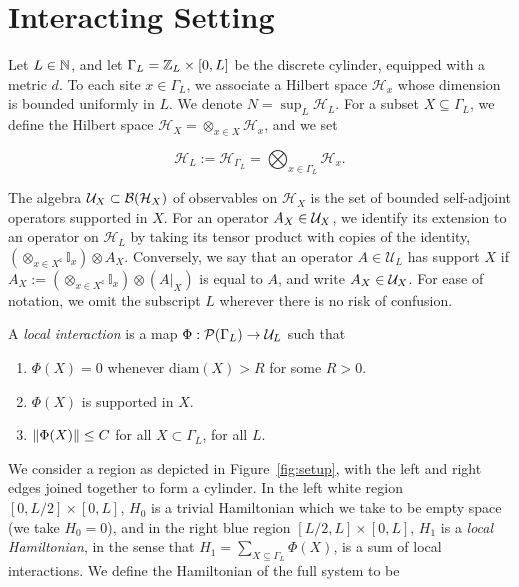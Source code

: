 \documentclass[12pt, letterpaper]{article}
\begin{document}
\section{Interacting Setting}

Let $L\in\mathbb{N}$, and let $\Gamma_L = \mathbb{Z}_L \times [0,L]$ be the discrete cylinder, equipped with a metric $d$. To each site $x \in \Gamma_L$, we associate a Hilbert space $\mathcal{H}_x$ whose dimension is bounded uniformly in $L$. We denote $N = \sup_L{\mathcal{H}_L}$. For a subset $X \subseteq \Gamma_L$, we define the Hilbert space $\mathcal{H}_X = \otimes_{x \in X} \mathcal{H}_x$, and we set 

\[\mathcal{H}_L := \mathcal{H}_{\Gamma_L} = \bigotimes_{x \in \Gamma_L}\mathcal{H}_x.\] 


The algebra $\mathcal{U}_X \subset \mathcal{B}(\mathcal{H}_X)$ of observables on $\mathcal{H}_X$ is the set of bounded self-adjoint operators supported in $X$. For an operator $A_X \in \mathcal{U}_X$, we identify its extension to an operator on $\mathcal{H}_L$ by taking its tensor product with copies of the identity, $(\otimes_{x \in X^\mathsf{c}} \mathbb{I}_x) \otimes A_X$. Conversely, we say that an operator $A \in \mathcal{U}_L$ has support $X$ if $A_X := (\otimes_{x \in X^\mathsf{c}} \mathbb{I}_x)\otimes (A|_{X})$ is equal to $A$, and write $A_X \in \mathcal{U}_X$. For ease of notation, we omit the subscript $L$ wherever there is no risk of confusion.

A \textit{local interaction} is a map $\Phi : \mathcal{P}(\Gamma_L) \to \mathcal{U}_L$ such that 

\begin{enumerate}

\item $\Phi(X) = 0$ whenever $\text{diam}(X) > R$ for some $R>0$.

\item $\Phi(X)$ is supported in $X$.

\item $\lVert \Phi(X) \rVert \leq C$ for all $X \subset \Gamma_L$, for all $L$.

\end{enumerate}

We consider a region as depicted in Figure~\ref{fig:setup}, with the left and right edges joined together to form a cylinder. In the left white region $[0,L/2] \times [0,L]$, $H_0$ is a trivial Hamiltonian which we take to be empty space (we take $H_0=0$), and in the right blue region $[L/2,L]\times [0,L]$, $H_1$ is a \textit{local Hamiltonian}, in the sense that $H_1 = \sum_{X \subseteq \Gamma_L} \Phi(X)$, is a sum of local interactions. We define the Hamiltonian of the full system to be 
\end{document}
